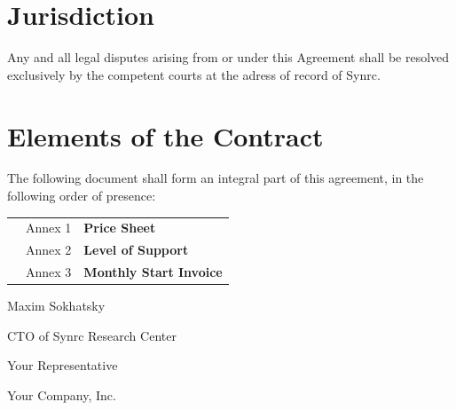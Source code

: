 \documentclass[11pt,oneside]{article}
\begin{document}
\section{Jurisdiction}
Any and all legal disputes arising from or under this Agreement shall be resolved
exclusively by the competent courts at the adress of record of Synrc.

\section{Elements of the Contract}
The following document shall form an integral part of this agreement,
in the following order of presence:

\vspace{1\baselineskip}
\begin{tabular}{lll}
        & Annex 1 & {\bf Price Sheet} \\
        & Annex 2 & {\bf Level of Support} \\
        & Annex 3 & {\bf Monthly Start Invoice}
\end{tabular}

\vspace{5\baselineskip}

  \begin{minipage}[t]{0.4\linewidth}
    \raggedright
    \par
    Maxim Sokhatsky\par
    CTO of Synrc Research Center
  \end{minipage}%
  \hfill
  \begin{minipage}[t]{0.4\linewidth}
    \Date
  \end{minipage}

  \vspace{1cm}
  \noindent
  \begin{minipage}[t]{0.4\linewidth}
    \raggedright
    \par
    Your Representative\par
    Your Company, Inc.
  \end{minipage}%
  \hfill
  \begin{minipage}[t]{0.4\linewidth}
    \Date
  \end{minipage}

\newpage
\vspace{3\baselineskip}
\paragraph{}
\noindent
\end{document}

